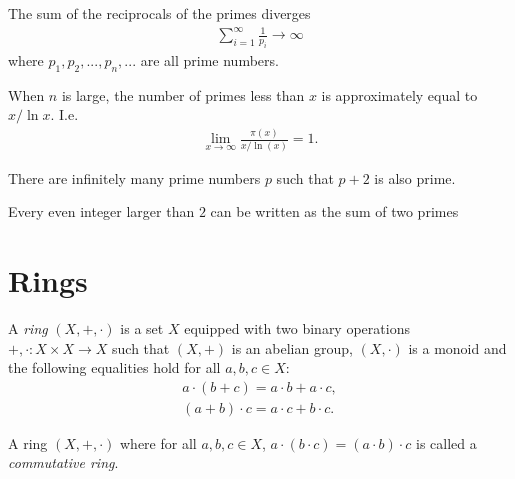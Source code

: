 \documentclass{article}
\begin{document}
\begin{theorem}[Boocher 2.8]
    The sum of the reciprocals of the primes diverges
    \begin{align*}
        \sum_{i=1}^\infty \frac{1}{p_i} \to \infty
    \end{align*} 
    where $p_1,p_2,...,p_n,...$ are all prime numbers.
\end{theorem}

\begin{theorem}[Boocher 2.9]
    When $n$ is large, the number of primes less than $x$ is approximately equal to
    $x/\ln x$. I.e. 
    \begin{align*}
        \lim_{x\to\infty} \frac{\pi(x)}{x/\ln(x)}=1.
    \end{align*} 
\end{theorem}

\begin{conjecture}
    There are infinitely many prime numbers $p$ such that 
    $p+2$ is also prime.
\end{conjecture}

\begin{conjecture}
    Every even integer larger than $2$ can be written as the 
    sum of two primes
\end{conjecture}

\section{Rings}

\begin{definition}[Ring]
    A \emph{ring} $(X,+,\cdot)$ is a set $X$ equipped with two binary operations
    $+,\cdot:X\times X\to X$ such that $(X,+)$ is an abelian group, $(X,\cdot)$
    is a monoid and the following equalities hold for all $a,b,c\in X$:
    \begin{align*}
        a       \cdot (b + c)   = a \cdot b + a \cdot c, \\
        (a+b)   \cdot c         = a \cdot c + b \cdot c.
    \end{align*}
\end{definition}

\begin{definition}
    A ring $(X,+,\cdot)$ where for all $a,b,c\in X$, $a\cdot(b\cdot c) = (a\cdot b)\cdot c$
    is called a \emph{commutative ring}.
\end{definition}
\end{document}
